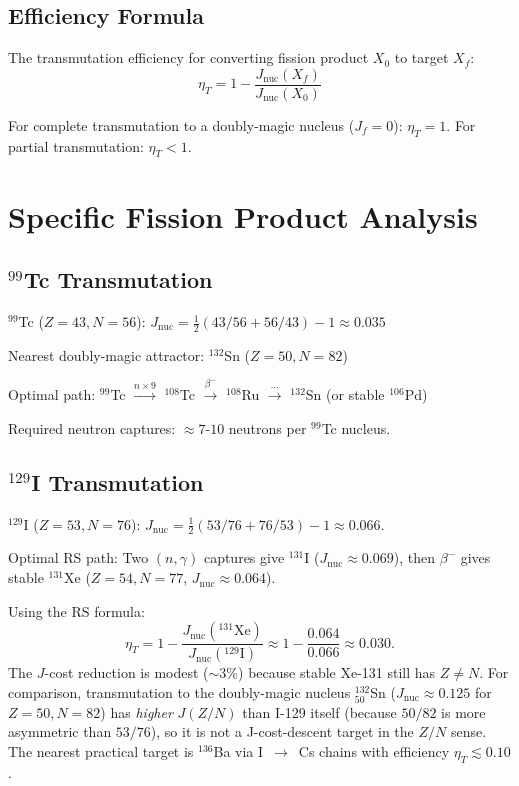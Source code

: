 \documentclass[12pt,a4paper]{article}
\theoremstyle{definition}
\theoremstyle{remark}
\begin{document}
\subsection{Efficiency Formula}

The transmutation efficiency for converting fission product $X_0$ to target $X_f$:
\begin{equation}
\eta_T = 1 - \frac{J_\mathrm{nuc}(X_f)}{J_\mathrm{nuc}(X_0)}
\end{equation}

For complete transmutation to a doubly-magic nucleus ($J_f = 0$): $\eta_T = 1$.
For partial transmutation: $\eta_T < 1$.

\section{Specific Fission Product Analysis}

\subsection{${}^{99}$Tc Transmutation}

${}^{99}$Tc ($Z=43, N=56$): $J_\mathrm{nuc} = \frac{1}{2}(43/56 + 56/43) - 1 \approx 0.035$

Nearest doubly-magic attractor: ${}^{132}$Sn ($Z=50, N=82$)

Optimal path: ${}^{99}$Tc $\xrightarrow{n \times 9}$ ${}^{108}$Tc $\xrightarrow{\beta^-}$ 
${}^{108}$Ru $\xrightarrow{\cdots}$ ${}^{132}$Sn (or stable ${}^{106}$Pd)

Required neutron captures: $\approx 7$-$10$ neutrons per ${}^{99}$Tc nucleus.

\subsection{${}^{129}$I Transmutation}

${}^{129}$I ($Z=53, N=76$): $J_\mathrm{nuc} = \tfrac{1}{2}(53/76 + 76/53) - 1
\approx 0.066$.

Optimal RS path: Two $(n, \gamma)$ captures give ${}^{131}$I
($J_\mathrm{nuc} \approx 0.069$), then $\beta^-$ gives stable ${}^{131}$Xe
($Z=54, N=77$, $J_\mathrm{nuc} \approx 0.064$).

Using the RS formula:
\[
\eta_T = 1 - \frac{J_\mathrm{nuc}({}^{131}\mathrm{Xe})}{J_\mathrm{nuc}({}^{129}\mathrm{I})}
\approx 1 - \frac{0.064}{0.066} \approx 0.030.
\]
The $J$-cost reduction is modest ($\sim 3\%$) because stable Xe-131 still has
$Z \neq N$.  For comparison, transmutation to the doubly-magic nucleus
${}^{132}_{50}$Sn ($J_\mathrm{nuc} \approx 0.125$ for $Z=50, N=82$) has
\emph{higher} $J(Z/N)$ than I-129 itself (because $50/82$ is more asymmetric
than $53/76$), so it is not a J-cost-descent target in the $Z/N$ sense.  The
nearest practical target is ${}^{136}$Ba via I~$\to$~Cs chains with efficiency
$\eta_T \lesssim 0.10$.
\end{document}
